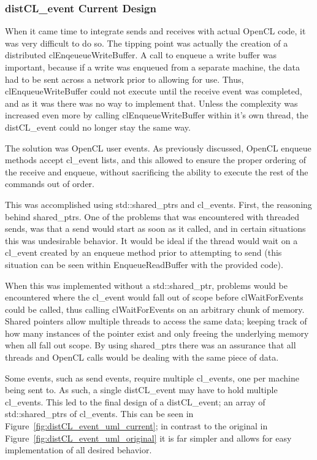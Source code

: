 \documentclass[report.tex]{subfiles}
\begin{document}
        \subsubsection{distCL\_event Current Design} %
        \label{ssub:distcl_event_current_design}
            When it came time to integrate sends and receives with actual OpenCL code, it was very difficult to do so. The tipping point was actually the creation of a distributed clEnqeueueWriteBuffer. A call to enqueue a write buffer was important, because if a write was enqueued from a separate machine, the data had to be sent across a network prior to allowing for use. Thus, clEnqueueWriteBuffer could not execute until the receive event was completed, and as it was there was no way to implement that. Unless the complexity was increased even more by calling clEnqueueWriteBuffer within it's own thread, the distCL\_event could no longer stay the same way.

            The solution was OpenCL user events. As previously discussed, OpenCL enqueue methods accept cl\_event lists, and this allowed to ensure the proper ordering of the receive and enqueue, without sacrificing the ability to execute the rest of the commands out of order.

            This was accomplished using std::shared\_ptrs and cl\_events. First, the reasoning behind shared\_ptrs. One of the problems that was encountered  with threaded sends, was that a send would start as soon as it called, and in certain situations this was undesirable behavior. It would be ideal if the thread would wait on a cl\_event created by an enqueue method prior to attempting to send (this situation can be seen within EnqueueReadBuffer with the provided code). 

            When this was implemented without a std::shared\_ptr, problems would be encountered where the cl\_event would fall out of scope before clWaitForEvents could be called, thus calling clWaitForEvents on an arbitrary chunk of memory. Shared pointers allow multiple threads to access the same data; keeping track of how many instances of the pointer exist and only freeing the underlying memory when all fall out scope. By using shared\_ptrs there was an assurance that all threads and OpenCL calls would be dealing with the same piece of data.

            Some events, such as send events, require multiple cl\_events, one per machine being sent to. As such, a single distCL\_event may have to hold multiple cl\_events. This led to the final design of a distCL\_event; an array of std::shared\_ptrs of cl\_events. This can be seen in Figure~\ref{fig:distCL_event_uml_current}; in contrast to the original in Figure~\ref{fig:distCL_event_uml_original} it is far simpler and allows for easy implementation of all desired behavior.
            
\end{document}
